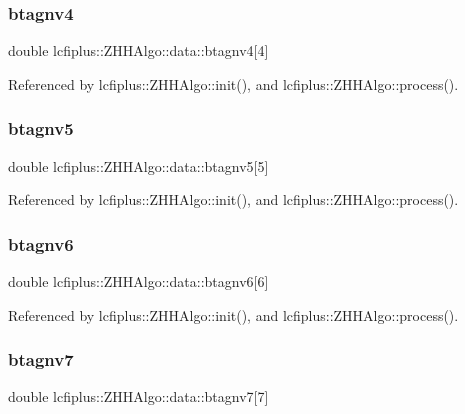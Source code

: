 \subsubsection{btagnv4}
{\footnotesize\ttfamily double lcfiplus\+::\+Z\+H\+H\+Algo\+::data\+::btagnv4[4]}



Referenced by lcfiplus\+::\+Z\+H\+H\+Algo\+::init(), and lcfiplus\+::\+Z\+H\+H\+Algo\+::process().

\mbox{\label{structlcfiplus_1_1ZHHAlgo_1_1data_a21441c47e3d6523aa24dfdcb3947a657}} 
\subsubsection{btagnv5}
{\footnotesize\ttfamily double lcfiplus\+::\+Z\+H\+H\+Algo\+::data\+::btagnv5[5]}



Referenced by lcfiplus\+::\+Z\+H\+H\+Algo\+::init(), and lcfiplus\+::\+Z\+H\+H\+Algo\+::process().

\mbox{\label{structlcfiplus_1_1ZHHAlgo_1_1data_a50f614d242958fbd5e8dfe4e87d44a98}} 
\subsubsection{btagnv6}
{\footnotesize\ttfamily double lcfiplus\+::\+Z\+H\+H\+Algo\+::data\+::btagnv6[6]}



Referenced by lcfiplus\+::\+Z\+H\+H\+Algo\+::init(), and lcfiplus\+::\+Z\+H\+H\+Algo\+::process().

\mbox{\label{structlcfiplus_1_1ZHHAlgo_1_1data_a9fd2974d1bff7f3490af5eeff40e9e78}} 
\subsubsection{btagnv7}
{\footnotesize\ttfamily double lcfiplus\+::\+Z\+H\+H\+Algo\+::data\+::btagnv7[7]}



